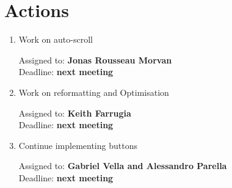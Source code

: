 \documentclass{cce2014-meetings}
\begin{document}
\section*{Actions}

\begin{enumerate}

      \item Work on auto-scroll
      \begin{flushright}
            Assigned to: \textbf{Jonas Rousseau Morvan}\\
            Deadline: \textbf{next meeting}
      \end{flushright}

      \item Work on reformatting and Optimisation
      \begin{flushright}
            Assigned to: \textbf{Keith Farrugia}\\
            Deadline: \textbf{next meeting}
      \end{flushright}

      \item Continue implementing buttons
      \begin{flushright}
            Assigned to: \textbf{Gabriel Vella and Alessandro Parella}\\
            Deadline: \textbf{next meeting}
      \end{flushright}

\end{enumerate}
\end{document}
